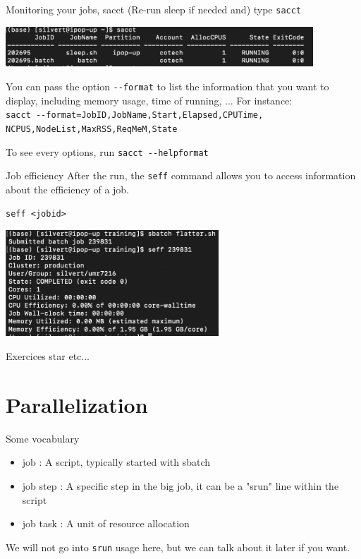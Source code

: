 \documentclass{beamer}
\begin{document}
    



\begin{frame}[fragile]{Monitoring your jobs, sacct}
(Re-run sleep if needed and) type \verb|sacct| 
    
\includegraphics[height = 1.5cm]{Images/sacct.png}

\parskip=12pt

You can pass the option \verb|--format| to list the information that you want to display, including memory usage, time of running, ... For instance: \\
\verb|sacct --format=JobID,JobName,Start,Elapsed,CPUTime,|  \\
\verb|NCPUS,NodeList,MaxRSS,ReqMeM,State|
\parskip=12pt

To see every options, run \verb|sacct --helpformat|

\end{frame} 

\begin{frame}[fragile]{Job efficiency}
    After the run, the \verb|seff| command allows you to access information about the efficiency of a job.
    
    \verb|seff <jobid>|
    \begin{center}
            \includegraphics[width = 8cm]{Images/seffExample.png}
    \end{center}

Exercices star etc...
   
\end{frame}

\section{Parallelization}
\begin{frame}[fragile]{Some vocabulary}
\begin{itemize}
    \item job : A script, typically started with sbatch
    \item job step : A specific step in the big job, it can be a "srun" line within the script
    \item job task : A unit of resource allocation
\end{itemize}

We will not go into \verb|srun| usage here, but we can talk about it later if you want.
    
\end{frame}
\end{document}
